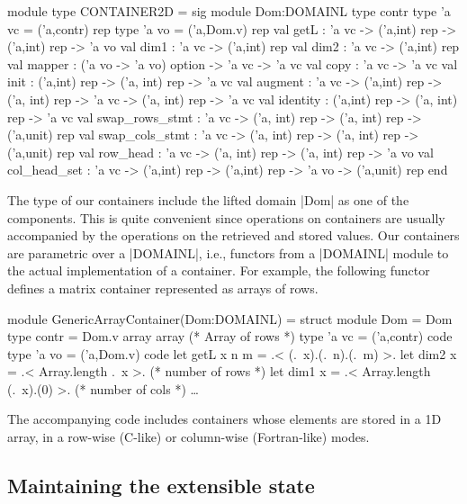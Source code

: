 \documentclass[draft]{elsart}
\begin{document}
\begin{code}
module type CONTAINER2D = sig
  module Dom:DOMAINL
  type contr
  type 'a vc = ('a,contr) rep
  type 'a vo = ('a,Dom.v) rep
  val getL : 'a vc -> ('a,int) rep -> ('a,int) rep -> 'a vo
  val dim1 : 'a vc -> ('a,int) rep
  val dim2 : 'a vc -> ('a,int) rep
  val mapper : ('a vo -> 'a vo) option -> 'a vc -> 'a vc
  val copy : 'a vc -> 'a vc
  val init : ('a,int) rep -> ('a, int) rep -> 'a vc
  val augment : 'a vc -> ('a,int) rep -> ('a, int) rep -> 'a vc ->
                ('a, int) rep -> 'a vc
  val identity : ('a,int) rep -> ('a, int) rep -> 'a vc
  val swap_rows_stmt : 'a vc -> ('a, int) rep -> ('a, int) rep -> 
                       ('a,unit) rep
  val swap_cols_stmt : 'a vc -> ('a, int) rep -> ('a, int) rep -> 
                       ('a,unit) rep
  val row_head : 'a vc -> ('a, int) rep -> ('a, int) rep -> 'a vo
  val col_head_set : 'a vc -> ('a,int) rep -> ('a,int) rep -> 'a vo -> 
            ('a,unit) rep
end
\end{code}

The type of our containers include the lifted domain |Dom| as one of
the components. This is quite convenient since operations on containers
are usually accompanied by the operations on the retrieved and stored
values. Our containers are parametric over a |DOMAINL|, i.e., functors
from a |DOMAINL| module to the actual implementation of a
container. For example, the following functor defines a matrix
container represented as arrays of rows.

\begin{code}
module GenericArrayContainer(Dom:DOMAINL) =
  struct
  module Dom = Dom
  type contr = Dom.v array array (* Array of rows *)
  type 'a vc = ('a,contr) code
  type 'a vo = ('a,Dom.v) code
  let getL x n m = .< (.~x).(.~n).(.~m) >.
  let dim2 x = .< Array.length .~x >.       (* number of rows *)
  let dim1 x = .< Array.length (.~x).(0) >. (* number of cols *)
  \dots
\end{code}
%
The accompanying code includes containers whose
elements are stored in a 1D array, in a
row-wise (C-like) or column-wise (Fortran-like) modes.


\subsection{Maintaining the extensible state}
\end{document}
